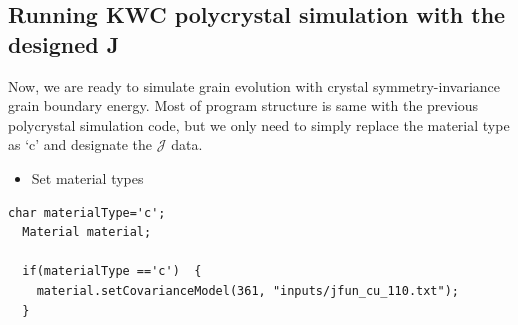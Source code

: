 \documentclass[11pt]{article}
\begin{document}
\subsection{Running KWC polycrystal simulation with the designed J}

Now, we are ready to simulate grain evolution 
with crystal symmetry-invariance grain boundary energy. 
Most of program structure is same with the previous polycrystal simulation code, 
but we only need to simply replace the material type as `c' and designate 
the $\mathcal{J}$ data.\\

\begin{itemize} \item Set material types\end{itemize}

\begin{tcolorbox}
\begin{lstlisting}[basicstyle=\footnotesize]
char materialType='c';
  Material material;

  if(materialType =='c')  {
    material.setCovarianceModel(361, "inputs/jfun_cu_110.txt");
  }
\end{lstlisting}
\end{tcolorbox}



\end{document}
